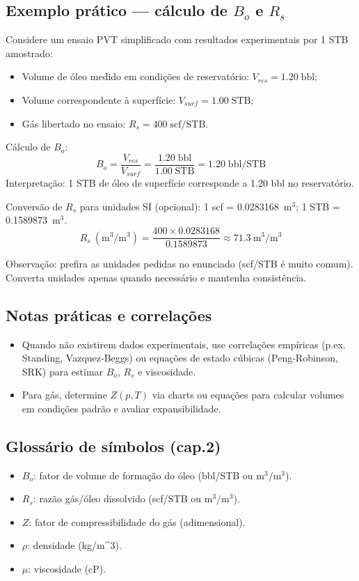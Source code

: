 \documentclass[11pt,a4paper]{article}
\begin{document}
\subsection{Exemplo prático — cálculo de $B_o$ e $R_s$}
Considere um ensaio PVT simplificado com resultados experimentais por 1 STB amostrado:
\begin{itemize}
\item Volume de óleo medido em condições de reservatório: $V_{res} = 1.20\;\text{bbl}$;
\item Volume correspondente à superfície: $V_{surf} = 1.00\;\text{STB}$;
\item Gás libertado no ensaio: $R_s = 400\;\text{scf/STB}$.
\end{itemize}

Cálculo de $B_o$:
$$
B_o = \frac{V_{res}}{V_{surf}} = \frac{1.20\;\text{bbl}}{1.00\;\text{STB}} = 1.20\;\text{bbl/STB}
$$
Interpretação: 1 STB de óleo de superfície corresponde a 1.20 bbl no reservatório.

Conversão de $R_s$ para unidades SI (opcional):
1 scf = 0.0283168~m$^3$; 1 STB = 0.1589873~m$^3$.
$$
R_s\ (\mathrm{m}^3/\mathrm{m}^3) = \frac{400\times0.0283168}{0.1589873} \approx 71.3\ \mathrm{m}^3/\mathrm{m}^3
$$

Observação: prefira as unidades pedidas no enunciado (scf/STB é muito comum). Converta unidades apenas quando necessário e mantenha consistência.

\subsection{Notas práticas e correlações}
\begin{itemize}
\item Quando não existirem dados experimentais, use correlações empíricas (p.ex. Standing, Vazquez‑Beggs) ou equações de estado cúbicas (Peng‑Robinson, SRK) para estimar $B_o$, $R_s$ e viscosidade.
\item Para gás, determine $Z(p,T)$ via charts ou equações para calcular volumes em condições padrão e avaliar expansibilidade.
\end{itemize}

\subsection{Glossário de símbolos (cap.2)}
\begin{itemize}
\item $B_o$: fator de volume de formação do óleo (bbl/STB ou $\mathrm{m}^3/\mathrm{m}^3$).
\item $R_s$: razão gás/óleo dissolvido (scf/STB ou $\mathrm{m}^3/\mathrm{m}^3$).
\item $Z$: fator de compressibilidade do gás (adimensional).
\item $\rho$: densidade (kg/m^3).
\item $\mu$: viscosidade (cP).
\end{itemize}
\end{document}
